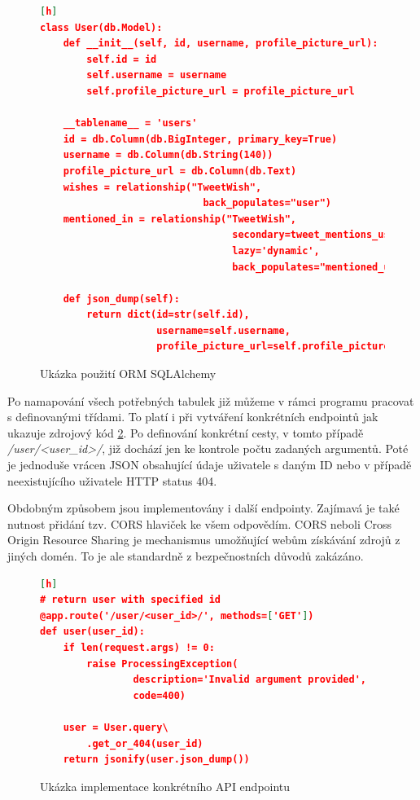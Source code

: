 \documentclass[thesis=B,czech]{FITthesis}[2012/06/26]
\begin{document}
\begin{figure}
\begin{lstlisting}[language=json,firstnumber=1][h]
class User(db.Model):
	def __init__(self, id, username, profile_picture_url):
		self.id = id
		self.username = username
		self.profile_picture_url = profile_picture_url

	__tablename__ = 'users'
	id = db.Column(db.BigInteger, primary_key=True)
	username = db.Column(db.String(140))
	profile_picture_url = db.Column(db.Text)
	wishes = relationship("TweetWish",
							back_populates="user")
	mentioned_in = relationship("TweetWish",
    							 secondary=tweet_mentions_user,
								 lazy='dynamic',
								 back_populates="mentioned_users")

	def json_dump(self):
		return dict(id=str(self.id),
					username=self.username,
					profile_picture_url=self.profile_picture_url)
\end{lstlisting}
\caption{Ukázka použití ORM SQLAlchemy}
\label{fig:user-orm}
\end{figure} 

Po namapování všech potřebných tabulek již můžeme v rámci programu pracovat s definovanými třídami. To platí i při vytváření konkrétních endpointů jak ukazuje zdrojový kód \ref{fig:user-view}. Po definování konkrétní cesty, v tomto případě \textit{/user/<user\_id>/}, již dochází jen ke kontrole počtu zadaných argumentů. Poté je jednoduše vrácen JSON obsahující údaje uživatele s daným ID nebo v případě neexistujícího uživatele HTTP status 404. 

Obdobným způsobem jsou implementovány i další endpointy. Zajímavá je také nutnost přidání tzv. CORS hlaviček ke všem odpovědím. CORS neboli Cross Origin Resource Sharing je mechanismus umožňující webům získávání zdrojů z jiných domén. To je ale standardně z bezpečnostních důvodů zakázáno. 

\begin{figure}
\begin{lstlisting}[language=json,firstnumber=1][h]
# return user with specified id
@app.route('/user/<user_id>/', methods=['GET'])
def user(user_id):
	if len(request.args) != 0:
		raise ProcessingException(
				description='Invalid argument provided',
				code=400)

	user = User.query\
		.get_or_404(user_id)
	return jsonify(user.json_dump())
\end{lstlisting}
\caption{Ukázka implementace konkrétního API endpointu}
\label{fig:user-view}
\end{figure} 
\end{document}
